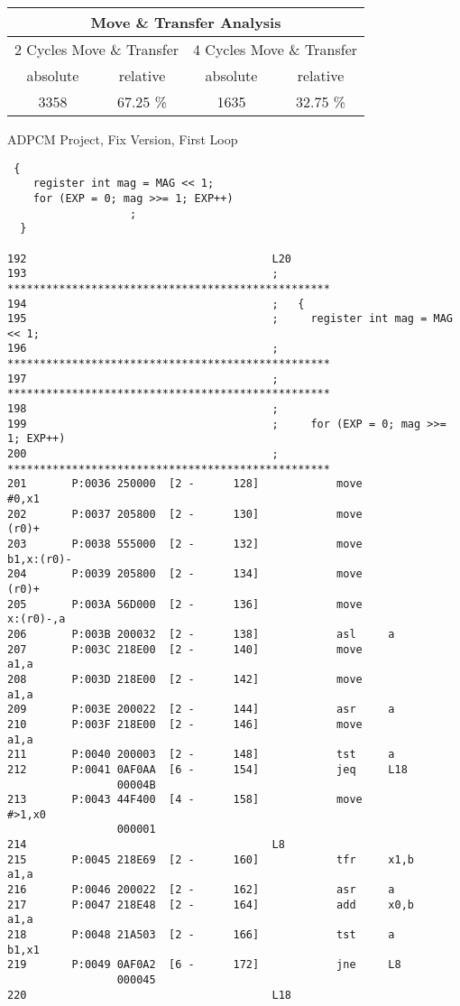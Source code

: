 \begin{table}
\begin{tabular}{|c|c|c|c|} \hline
\multicolumn{4}{|c|}{Move \& Transfer Analysis} \\ \hline
\multicolumn{2}{|c|}{2 Cycles Move \& Transfer}  &
\multicolumn{2}{|c|}{4 Cycles Move \& Transfer} \\ \hline
absolute & relative  & absolute & relative \\ 
3358  & 67.25 \%  & 1635 & 32.75 \% \\ \hline
\end{tabular}
\end{table}

\newpage

\centerline{ADPCM Project, Fix Version, First Loop}

{\small
\begin{verbatim}
 {	
    register int mag = MAG << 1;
    for (EXP = 0; mag >>= 1; EXP++)
                   ; 
  } 

192                                      L20
193                                      ; **************************************************
194                                      ;   {
195                                      ;     register int mag = MAG << 1;
196                                      ; **************************************************
197                                      ; **************************************************
198                                      ; 
199                                      ;     for (EXP = 0; mag >>= 1; EXP++)
200                                      ; **************************************************
201       P:0036 250000  [2 -      128]            move              #0,x1
202       P:0037 205800  [2 -      130]            move              (r0)+
203       P:0038 555000  [2 -      132]            move              b1,x:(r0)-
204       P:0039 205800  [2 -      134]            move              (r0)+
205       P:003A 56D000  [2 -      136]            move              x:(r0)-,a
206       P:003B 200032  [2 -      138]            asl     a
207       P:003C 218E00  [2 -      140]            move              a1,a
208       P:003D 218E00  [2 -      142]            move              a1,a
209       P:003E 200022  [2 -      144]            asr     a
210       P:003F 218E00  [2 -      146]            move              a1,a
211       P:0040 200003  [2 -      148]            tst     a
212       P:0041 0AF0AA  [6 -      154]            jeq     L18
                 00004B
213       P:0043 44F400  [4 -      158]            move              #>1,x0
                 000001
214                                      L8
215       P:0045 218E69  [2 -      160]            tfr     x1,b      a1,a
216       P:0046 200022  [2 -      162]            asr     a
217       P:0047 218E48  [2 -      164]            add     x0,b      a1,a
218       P:0048 21A503  [2 -      166]            tst     a         b1,x1
219       P:0049 0AF0A2  [6 -      172]            jne     L8
                 000045
220                                      L18
\end{verbatim}
}

